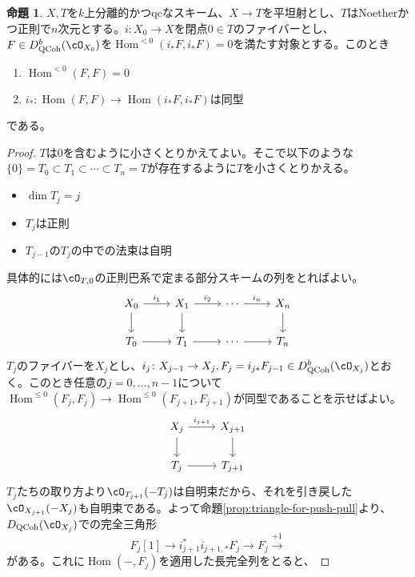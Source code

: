 \documentclass[uplatex, a4paper, dvipdfmx]{jsarticle}
\theoremstyle{definition}
\newtheorem{proposition}[theorem]{命題}
\DeclareMathOperator{\Hom}{\mathrm{Hom}}
\DeclareMathOperator{\QCoh}{\mathrm{QCoh}}
\begin{document}
\begin{proposition}
    $X, T$を$k$上分離的かつqcなスキーム、$X \to T$を平坦射とし、$T$はNoetherかつ正則で$n$次元とする。$i \colon X_0 \to X$を閉点$0 \in T$のファイバーとし、$F \in D_{\QCoh}^b(\cO_{X_0})$を$\Hom^{<0}(i_*F, i_*F) = 0$を満たす対象とする。このとき
    \begin{enumerate}
        \item $\Hom^{<0}(F, F) = 0$
        \item $i_* \colon \Hom(F, F) \to \Hom(i_*F, i_*F)$は同型
    \end{enumerate}
    である。
\end{proposition}
\begin{proof}
    $T$は$0$を含むように小さくとりかえてよい。そこで以下のような$\{0\} = T_0 \subset T_1 \subset \cdots \subset T_n = T$が存在するように$T$を小さくとりかえる。
    \begin{itemize}
        \item $\dim T_j = j$
        \item $T_j$は正則
        \item $T_{j-1}$の$T_j$の中での法束は自明
    \end{itemize}
    具体的には$\cO_{T, 0}$の正則巴系で定まる部分スキームの列をとればよい。
    \[
        \begin{tikzcd}
            X_0 \ar[r, "i_1"] \ar[d] & X_1 \ar[r, "i_2"] \ar[d] & \cdots \ar[r, "i_n"]& X_n \ar[d] \\
            T_0 \ar[r] & T_1 \ar[r] & \cdots \ar[r]& T_n
        \end{tikzcd}
    \]
    $T_j$のファイバーを$X_j$とし、$i_j \colon X_{j-1} \to X_{j}, F_{j} = i_{j*}F_{j-1} \in D_{\QCoh}^b(\cO_{X_j})$とおく。このとき任意の$j = 0, \dots, n-1$について$\Hom^{\leq 0}(F_{j}, F_{j}) \to \Hom^{\leq 0}(F_{j+1}, F_{j+1})$が同型であることを示せばよい。
    \[
        \begin{tikzcd}
            X_{j} \ar[r, "i_{j+1}"] \ar[d] & X_{j+1} \ar[d]\\
            T_{j} \ar[r] & T_{j+1}
        \end{tikzcd}
    \]
    $T_j$たちの取り方より$\cO_{T_{j+1}}(-T_{j})$は自明束だから、それを引き戻した$\cO_{X_{j+1}}(-X_{j})$も自明束である。よって命題\ref{prop:triangle-for-push-pull}より、$D_{\QCoh}(\cO_{X_j})$での完全三角形
    \begin{equation}
        F_j[1] \to i_{j+1}^*i_{j+1, *}F_j \to F_j \xrightarrow{+1}
    \end{equation}
    がある。これに$\Hom(-, F_j)$を適用した長完全列をとると、

\end{proof}
\end{document}
